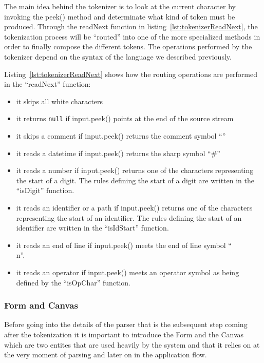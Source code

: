 The main idea behind the tokenizer is to look at the current character by invoking the peek() method and determinate what kind of token must be produced. Through the readNext function in listing~\ref{lst:tokenizerReadNext}, the tokenization process will be ``routed'' into one of the more specialized methods in order to finally compose the different tokens. The operations performed by the tokenizer depend on the syntax of the language we described previously.



Listing~\ref{lst:tokenizerReadNext} shows how the routing operations are performed in the ``readNext'' function:
\begin{itemize}
    \item it skips all white characters
    \item it returns \texttt{null} if input.peek() points at the end of the source stream
    \item it skips a comment if input.peek() returns the comment symbol ``\textquotesingle''
    \item it reads a datetime if input.peek() returns the sharp symbol ``\#''
    \item it reads a number if input.peek() returns one of the characters representing the start of a digit. The rules defining the start of a digit are written in the ``isDigit'' function.
    \item it reads an identifier or a path if input.peek() returns one of the characters representing the start of an identifier. The rules defining the start of an identifier are written in the ``isIdStart'' function.
    \item it reads an end of line if input.peek() meets the end of line symbol ``\\n''. 
    \item it reads an operator if input.peek() meets an operator symbol as being defined by the ``isOpChar'' function.
\end{itemize}

\subsubsection{Form and Canvas}

Before going into the details of the parser that is the subsequent step coming after the tokenization it is important to introduce the Form and the Canvas which are two entites that are used heavily by the system and that it relies on at the very moment of parsing and later on in the application flow.

